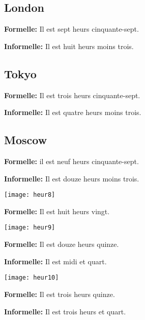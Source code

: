\subsection*{London}

\textbf{Formelle:} Il est sept heurs cinquante-sept.

\textbf{Informelle:} Il est huit heurs moins trois.

\subsection*{Tokyo}

\textbf{Formelle:} Il est trois heurs cinquante-sept.

\textbf{Informelle:} Il est quatre heurs moins trois.

\subsection*{Moscow}

\textbf{Formelle:} il est neuf heurs cinquante-sept.

\textbf{Informelle:} Il est douze heurs moins trois.

\begin{center}
    \texttt{[image: heur8]}
\end{center}

\textbf{Formelle:} Il est huit heurs vingt.

\begin{center}
    \texttt{[image: heur9]}
\end{center}

\textbf{Formelle:} Il est douze heurs quinze. 

\textbf{Informelle:} Il est midi et quart.

\begin{center}
    \texttt{[image: heur10]}
\end{center}

\textbf{Formelle:} Il est trois heurs quinze.


\textbf{Informelle:} Il est trois heurs et quart.